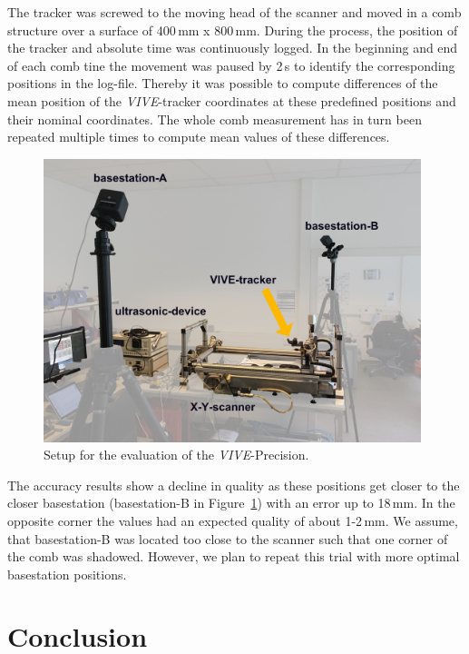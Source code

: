 \documentclass{VRARWorkshop}
\begin{document}
The tracker was screwed to the moving head of the scanner and moved in a comb structure over a surface of 400\,mm x 800\,mm.
During the process, the position of the tracker and absolute time was continuously logged.
In the beginning and end of each comb tine the movement was paused by 2\,s to identify the corresponding positions in the log-file.
Thereby it was possible to compute differences of the mean position of the \textit{VIVE}-tracker coordinates at these predefined positions and their nominal coordinates. 
The whole comb measurement has in turn been repeated multiple times to compute mean values of these differences.
\begin{figure}[h!]
    \begin{center}
        \includegraphics[width=110mm]{images/PrecisionMeasurement}
        \caption{\label{fig:precisionMeasurementSetup} Setup for the evaluation of the \textit{VIVE}-Precision.}
    \end{center}
\end{figure}
The accuracy results show a decline in quality as these positions get closer to the closer basestation (basestation-B in Figure~\ref{fig:precisionMeasurementSetup}) with an error up to 18\,mm.
In the opposite corner the values had an expected quality of about 1-2\,mm.
We assume, that basestation-B was located too close to the scanner such that one corner of the comb was shadowed.
However, we plan to repeat this trial with more optimal basestation positions.


\section{Conclusion}
\end{document}
